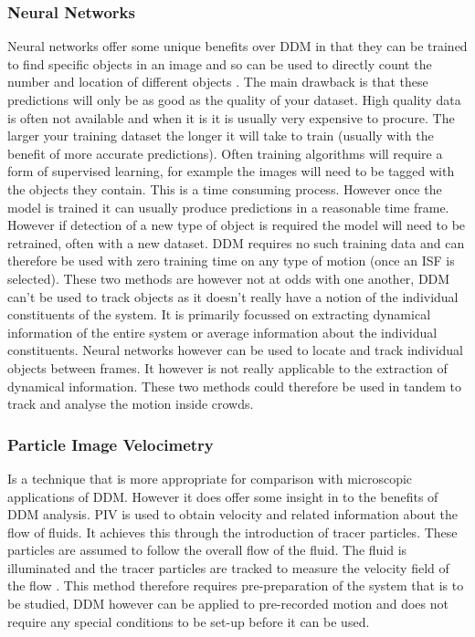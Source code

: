\documentclass[11pt]{article}
\begin{document}
\subsubsection{Neural Networks}
Neural networks offer some unique benefits over DDM in that they can be trained to find specific objects in an image and so can be used to directly count the number and location of different objects \cite{yolov3}. The main drawback is that these predictions will only be as good as the quality of your dataset. High quality data is often not available and when it is it is usually very expensive to procure. The larger your training dataset the longer it will take to train (usually with the benefit of more accurate predictions). Often training algorithms will require a form of supervised learning, for example the images will need to be tagged with the objects they contain. This is a time consuming process. However once the model is trained it can usually produce predictions in a reasonable time frame. However if detection of a new type of object is required the model will need to be retrained, often with a new dataset. \cite{tensorflow} DDM requires no such training data and can therefore be used with zero training time on any type of motion (once an ISF is selected). These two methods are however not at odds with one another, DDM can't be used to track objects as it doesn't really have a notion of the individual constituents of the system. It is primarily focussed on extracting dynamical information of the entire system or average information about the individual constituents. Neural networks however can be used to locate and track individual objects between frames. It however is not really applicable to the extraction of dynamical information. These two methods could therefore be used in tandem to track and analyse the motion inside crowds.

\subsubsection{Particle Image Velocimetry}
Is a technique that is more appropriate for comparison with microscopic applications of DDM. However it does offer some insight in to the benefits of DDM analysis. PIV is used to obtain velocity and related information about the flow of fluids. It achieves this through the introduction of tracer particles. These particles are assumed to follow the overall flow of the fluid. The fluid is illuminated and the tracer particles are tracked to measure the velocity field of the flow \cite{piv}. This method therefore requires pre-preparation of the system that is to be studied, DDM however can be applied to pre-recorded motion and does not require any special conditions to be set-up before it can be used. 
\end{document}
